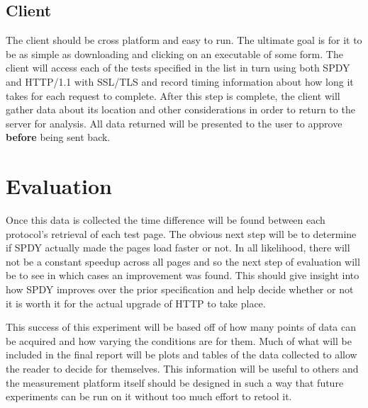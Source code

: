 \documentclass[11pt,letterpaper,notitlepage]{article}
\begin{document}
\subsection{Client}
\label{sec:project/client}
The client should be cross platform and easy to run.  The ultimate goal is for
it to be as simple as downloading and clicking on an executable of some form.
The client will access each of the tests specified in the list in turn using
both SPDY and HTTP/1.1 with SSL/TLS and
record timing information about how long it takes for each request to complete.
After this step is complete, the client will gather data about its location and
other considerations in order to return to the server for analysis.  All data
returned will be presented to the user to approve \textbf{before} being sent back. 

\section{Evaluation}
\label{sec:eval}
Once this data is collected the time difference will be found between each
protocol's retrieval of each test page. The obvious next step will be to
determine if SPDY actually made the pages load faster or not. In all likelihood,
there will not be a constant speedup across all pages and so the next step of
evaluation will be to see in which cases an improvement was found. This should
give insight into how SPDY improves over the prior specification and help decide
whether or not it is worth it for the actual upgrade of HTTP to take place.

This success of this experiment will be based off of how many points of data can
be acquired and how varying the conditions are for them.  Much of what will be
included in the final report will be plots and tables of the data collected to
allow the reader to decide for themselves.  This information will be useful to
others and the measurement platform itself should be designed in such a way that
future experiments can be run on it without too much effort to retool it.



\end{document}
